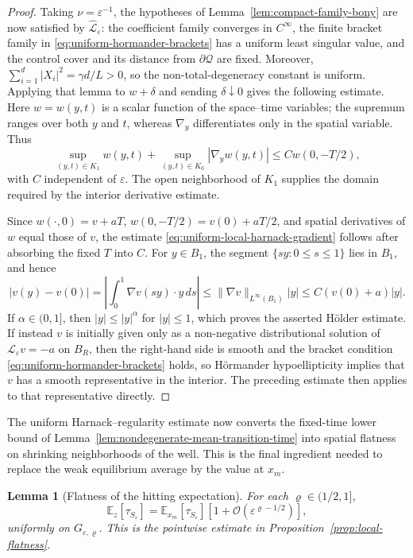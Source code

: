 \documentclass[11pt]{article}
\numberwithin{equation}{section}
\theoremstyle{plain}
\newtheorem{lemma}[theorem]{Lemma}
\theoremstyle{definition}
\theoremstyle{remark}
\newcommand{\eps}{\varepsilon}
\newcommand{\E}{\mathbb E}
\begin{document}
\begin{proof}
Taking $\nu=\eps^{-1}$, the hypotheses of
Lemma~\ref{lem:compact-family-bony} are now satisfied by
$\widehat{\mathscr L}_\eps$: the coefficient family converges in $C^\infty$,
the finite bracket family in
\eqref{eq:uniform-hormander-brackets}  has a uniform least singular value, and
the control cover and its distance from $\partial\mathcal Q$ are fixed.
Moreover,
$\sum_{i=1}^d|X_i|^2=\gamma d/L>0$, so the non-total-degeneracy constant is
uniform.
Applying that lemma to $w+\delta$ and sending $\delta\downarrow0$ gives the
following estimate.  Here $w=w(y,t)$ is a scalar function of the space--time variables;
the supremum ranges over both $y$ and $t$, whereas $\nabla_y$ differentiates
only in the spatial variable.  Thus
\[
\sup_{(y,t)\in K_1}w(y,t)
+\sup_{(y,t)\in K_0}|\nabla_yw(y,t)|
\le Cw(0,-T/2),
\]
with $C$ independent of $\eps$.  The open neighborhood
of $K_1$ supplies the domain required by the interior derivative
estimate.

Since $w(\cdot,0)=v+aT$,
$w(0,-T/2)=v(0)+aT/2$, and spatial derivatives of $w$ equal those of $v$, the
estimate \eqref{eq:uniform-local-harnack-gradient} follows after absorbing
the fixed $T$ into $C$.
For $y\in B_1$, the segment $\{sy:0\le s\le1\}$ lies in $B_1$, and hence
\[
|v(y)-v(0)|
=\left|\int_0^1\nabla v(sy)\cdot y\,ds\right|
\le \|\nabla v\|_{L^\infty(B_1)}|y|
\le C\left(v(0)+a\right)|y|.
\]
If $\alpha\in(0,1]$, then $|y|\le|y|^\alpha$ for $|y|\le1$, which proves the
asserted H\"older estimate.  If instead $v$ is initially given only as a
non-negative distributional solution of
$\mathscr L_\eps v=-a$ on $B_R$, then the right-hand side is smooth and the
bracket condition \eqref{eq:uniform-hormander-brackets} holds, so H\"ormander
hypoellipticity \cite{Hormander1967} implies that $v$ has a smooth
representative in the interior.  The preceding estimate then applies to that
representative directly.
\end{proof}


The uniform Harnack--regularity estimate now converts the
fixed-time lower bound of
Lemma~\ref{lem:nondegenerate-mean-transition-time} into spatial flatness on
shrinking neighborhoods of the well.  This is the final ingredient needed to
replace the weak equilibrium average by the value at $x_m$.

\begin{lemma}[Flatness of the hitting expectation]
\label{lem:intrawell-flatness-reduction}
For each $\varrho\in(1/2,1]$,
\[
\E_z[\tau_{S_\eps}]
=\E_{x_m}[\tau_{S_\eps}]
\left[1+\mathcal O\left(\eps^{\varrho-1/2}\right)\right], 
\]
uniformly on $G_{\eps,\varrho}$.
This is the pointwise estimate in Proposition~\ref{prop:local-flatness}.
\end{lemma}
\end{document}
